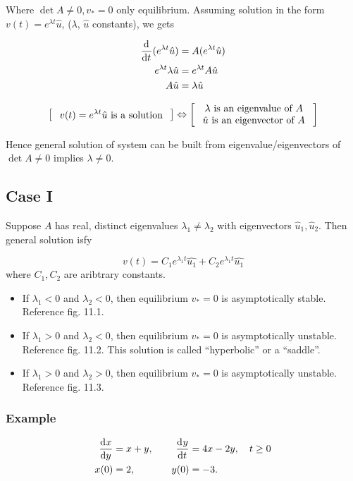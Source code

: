 \documentclass[12pt]{article}
\begin{document}
Where $\det A\ne0, v_*=0$ only equilibrium. Assuming solution in the form
$v(t)=e^{\lambda t}\hat{u}$, ($\lambda$, $\hat{u}$ constants), we gets

\begin{equation}
  \begin{aligned}
    \frac{\mathrm{d}^{} {}}{\mathrm{d}{t}^{}}(e^{\lambda t}\hat{u}) &= A(e^{\lambda t}\hat{u}) \\
    e^{\lambda t}\lambda\hat{u} &= e^{\lambda t}A\hat{u} \\
    A\hat{u} &= \lambda\hat{u}
  \end{aligned}
\end{equation}

\begin{equation}
  \left[ \text{\parbox{12em}{\centering $v(t)=e^{\lambda t}\hat{u}$ is a solution}}
 \right] \Leftrightarrow
  \left[ \parbox{12em}{\centering \text{$\lambda$ is an eigenvalue of $A$} \\
      \text{$\hat{u}$ is an eigenvector of $A$}} \right]
\end{equation}

Hence general solution of system can be built from eigenvalue/eigenvectors of
$\det A\ne0$ implies $\lambda\ne0$.

\subsection{Case I}
Suppose $A$ has real, distinct eigenvalues $\lambda_1\ne\lambda_2$ with
eigenvectors $\hat{u}_1,\hat{u}_2$. Then general solution isfy

$$v(t)= C_1e^{\lambda_1 t}\hat{u_1} + C_2e^{\lambda_1 t}\hat{u_1}$$ where
$C_1,C_2$ are aribtrary constants.

\begin{itemize}
\item If $\lambda_1<0$ and $\lambda_2<0$, then equilibrium $v_*=0$ is
  asymptotically stable. Reference fig. 11.1.
\item If $\lambda_1>0$ and $\lambda_2<0$, then equilibrium $v_*=0$ is
  asymptotically unstable. Reference fig. 11.2. This solution is called
  ``hyperbolic'' or a ``saddle''.
\item If $\lambda_1>0$ and $\lambda_2>0$, then equilibrium $v_*=0$ is
  asymptotically unstable. Reference fig. 11.3.
\end{itemize}

\subsubsection{Example}
\begin{equation}
  \begin{aligned}
    \frac{\mathrm{d}^{} {x}}{\mathrm{d}{y}^{}} &= x+y,\quad& \frac{\mathrm{d}^{} {y}}{\mathrm{d}{t}^{}} &=4x-2y, \quad t\ge0 \\
    x(0) &= 2, \quad& y(0) &= -3.
  \end{aligned}
\end{equation}
\end{document}
